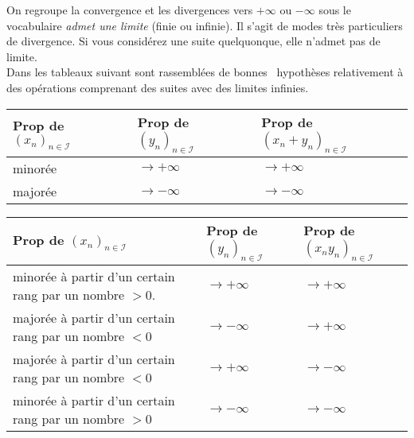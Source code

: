 On regroupe la convergence et les divergences vers $+\infty$ ou $-\infty$ sous le vocabulaire \emph{admet une limite} (finie ou infinie). Il s'agit de modes très particuliers de divergence. Si vous considérez une suite quelquonque, elle n'admet pas de limite.\\ 
Dans les tableaux suivant sont rassemblées de \og bonnes\fg~ hypothèses relativement à des opérations comprenant des suites avec des limites infinies.
\begin{center}
\renewcommand{\arraystretch}{1.3}
\begin{tabular}{l|l|l}
Prop de $\left(x_n \right)_{n\in\mathcal I}$ & Prop de $\left(y_n \right)_{n\in\mathcal I}$ & Prop de $\left(x_n+y_n \right)_{n\in\mathcal I}$\\ \hline
minorée & $\rightarrow+\infty$ & $\rightarrow+\infty$ \\ \hline
majorée & $\rightarrow-\infty$ & $\rightarrow-\infty$
\end{tabular}
\end{center}
\begin{center}
\renewcommand{\arraystretch}{1.3}
\begin{tabular}{l|l|l}
Prop de $\left(x_n \right)_{n\in\mathcal I}$ & Prop de $\left(y_n \right)_{n\in\mathcal I}$ & Prop de $\left(x_ny_n \right)_{n\in\mathcal I}$\\ \hline
minorée à partir d'un certain rang par un nombre $>0$. & $\rightarrow+\infty$ & $\rightarrow+\infty$ \\ \hline
majorée à partir d'un certain rang par un nombre $<0$ & $\rightarrow-\infty$ & $\rightarrow +\infty$\\ \hline
majorée à partir d'un certain rang par un nombre $<0$ & $\rightarrow+\infty$ & $\rightarrow -\infty$\\ \hline
minorée à partir d'un certain rang par un nombre $>0$ & $\rightarrow-\infty$ & $\rightarrow -\infty$\\ \hline
\end{tabular}
\end{center}
